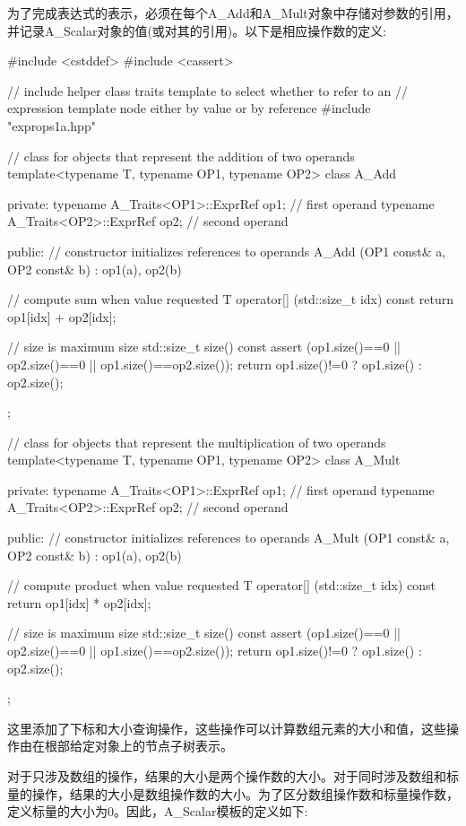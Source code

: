 为了完成表达式的表示，必须在每个A\_Add和A\_Mult对象中存储对参数的引用，并记录A\_Scalar对象的值(或对其的引用)。以下是相应操作数的定义:

\begin{cpp}
#include <cstddef>
#include <cassert>

// include helper class traits template to select whether to refer to an
// expression template node either by value or by reference
#include "exprops1a.hpp"

// class for objects that represent the addition of two operands
template<typename T, typename OP1, typename OP2>
class A_Add {
	private:
	typename A_Traits<OP1>::ExprRef op1; // first operand
	typename A_Traits<OP2>::ExprRef op2; // second operand
	
	public:
	// constructor initializes references to operands
	A_Add (OP1 const& a, OP2 const& b)
	: op1(a), op2(b) {
	}

	// compute sum when value requested
	T operator[] (std::size_t idx) const {
		return op1[idx] + op2[idx];
	}

	// size is maximum size
	std::size_t size() const {
		assert (op1.size()==0 || op2.size()==0
		|| op1.size()==op2.size());
		return op1.size()!=0 ? op1.size() : op2.size();
	}
};

// class for objects that represent the multiplication of two operands
template<typename T, typename OP1, typename OP2>
class A_Mult {
	private:
	typename A_Traits<OP1>::ExprRef op1; // first operand
	typename A_Traits<OP2>::ExprRef op2; // second operand
	
	public:
	// constructor initializes references to operands
	A_Mult (OP1 const& a, OP2 const& b)
	: op1(a), op2(b) {
	}

	// compute product when value requested
	T operator[] (std::size_t idx) const {
		return op1[idx] * op2[idx];
	}

	// size is maximum size
	std::size_t size() const {
		assert (op1.size()==0 || op2.size()==0
		|| op1.size()==op2.size());
		return op1.size()!=0 ? op1.size() : op2.size();
	}
};
\end{cpp}

这里添加了下标和大小查询操作，这些操作可以计算数组元素的大小和值，这些操作由在根部给定对象上的节点子树表示。

对于只涉及数组的操作，结果的大小是两个操作数的大小。对于同时涉及数组和标量的操作，结果的大小是数组操作数的大小。为了区分数组操作数和标量操作数，定义标量的大小为0。因此，A\_Scalar模板的定义如下:

